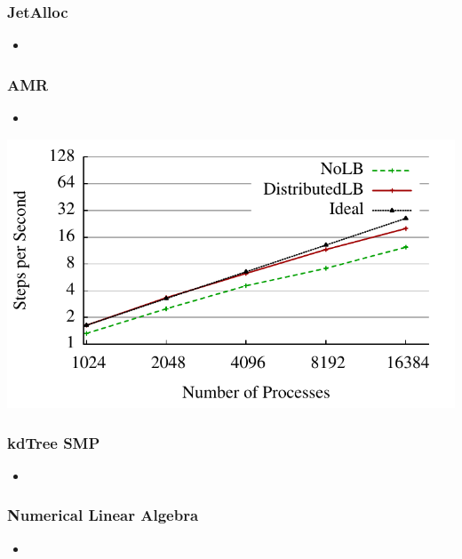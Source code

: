 \begin{frame}
\frametitle{JetAlloc}
%
\begin{itemize}
\item
\end{itemize}
%
\end{frame}

\begin{frame}
\frametitle{AMR}
%
\begin{itemize}
\item
\end{itemize}
%
\includegraphics[scale=0.7]{../figures/amr_scaling_distlb.pdf}
\end{frame}

\begin{frame}
\frametitle{kdTree SMP}
%
\begin{itemize}
\item
\end{itemize}
%
\end{frame}

\begin{frame}
\frametitle{Numerical Linear Algebra}
%
\begin{itemize}
\item
\end{itemize}
%
\end{frame}

